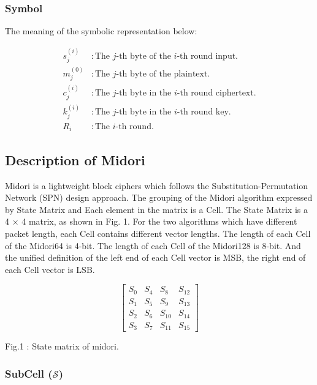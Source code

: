 \documentclass[journal=tosc,preprint]{iacrtrans}
\begin{document}
\subsubsection{Symbol}

The meaning of the symbolic representation below:

\begin{align*}
    s_j^{(i)} & : \text{The } j\text{-th byte of the } i\text{-th round input.}      \\
    m_j^{(0)} & : \text{The } j\text{-th byte of the plaintext.}                     \\
    c_j^{(i)} & : \text{The } j\text{-th byte in the } i\text{-th round ciphertext.} \\
    k_j^{(i)} & : \text{The } j\text{-th byte in the } i\text{-th round key.}        \\
    R_i       & : \text{The } i\text{-th round.}
\end{align*}


\subsection{Description of Midori}
Midori is a lightweight block ciphers which follows the
Substitution-Permutation Network (SPN) design approach.
The grouping of the Midori algorithm expressed by State
Matrix and Each element in the matrix is a Cell. The State
Matrix is a 4 × 4 matrix, as shown in Fig. 1. For the two
algorithms which have different packet length, each Cell
contains different vector lengths. The length of each Cell of
the Midori64 is 4-bit. The length of each Cell of the
Midori128 is 8-bit. And the unified definition of the left end
of each Cell vector is MSB, the right end of each Cell vector
is LSB.



\[
    \begin{bmatrix}
        S_{0} & S_{4} & S_{8}  & S_{12} \\
        S_{1} & S_{5} & S_{9}  & S_{13} \\
        S_{2} & S_{6} & S_{10} & S_{14} \\
        S_{3} & S_{7} & S_{11} & S_{15}
    \end{bmatrix}
\]

\begin{center}
    Fig.1 : State matrix of midori.
\end{center}

\subsubsection{SubCell (\( \mathcal{S} \))}
\end{document}
